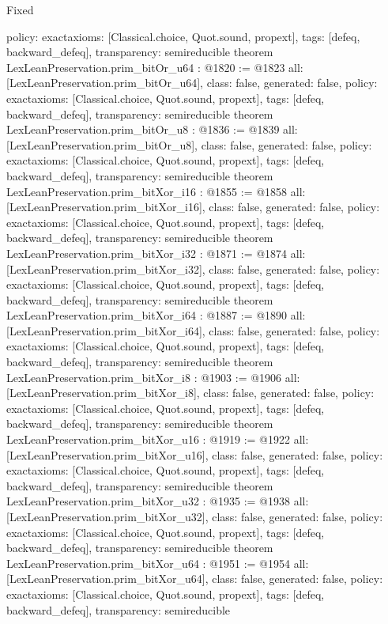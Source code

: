 \begin{lexlean}{Fixed}
\begin{coremodule}
{  policy: exact{axioms: [Classical.choice, Quot.sound, propext]},
  tags: [defeq, backward_defeq],
  transparency: semireducible
}
theorem LexLeanPreservation.prim_bitOr_u64 : @1820 := @1823 {
  all: [LexLeanPreservation.prim_bitOr_u64],
  class: false,
  generated: false,
  policy: exact{axioms: [Classical.choice, Quot.sound, propext]},
  tags: [defeq, backward_defeq],
  transparency: semireducible
}
theorem LexLeanPreservation.prim_bitOr_u8 : @1836 := @1839 {
  all: [LexLeanPreservation.prim_bitOr_u8],
  class: false,
  generated: false,
  policy: exact{axioms: [Classical.choice, Quot.sound, propext]},
  tags: [defeq, backward_defeq],
  transparency: semireducible
}
theorem LexLeanPreservation.prim_bitXor_i16 : @1855 := @1858 {
  all: [LexLeanPreservation.prim_bitXor_i16],
  class: false,
  generated: false,
  policy: exact{axioms: [Classical.choice, Quot.sound, propext]},
  tags: [defeq, backward_defeq],
  transparency: semireducible
}
theorem LexLeanPreservation.prim_bitXor_i32 : @1871 := @1874 {
  all: [LexLeanPreservation.prim_bitXor_i32],
  class: false,
  generated: false,
  policy: exact{axioms: [Classical.choice, Quot.sound, propext]},
  tags: [defeq, backward_defeq],
  transparency: semireducible
}
theorem LexLeanPreservation.prim_bitXor_i64 : @1887 := @1890 {
  all: [LexLeanPreservation.prim_bitXor_i64],
  class: false,
  generated: false,
  policy: exact{axioms: [Classical.choice, Quot.sound, propext]},
  tags: [defeq, backward_defeq],
  transparency: semireducible
}
theorem LexLeanPreservation.prim_bitXor_i8 : @1903 := @1906 {
  all: [LexLeanPreservation.prim_bitXor_i8],
  class: false,
  generated: false,
  policy: exact{axioms: [Classical.choice, Quot.sound, propext]},
  tags: [defeq, backward_defeq],
  transparency: semireducible
}
theorem LexLeanPreservation.prim_bitXor_u16 : @1919 := @1922 {
  all: [LexLeanPreservation.prim_bitXor_u16],
  class: false,
  generated: false,
  policy: exact{axioms: [Classical.choice, Quot.sound, propext]},
  tags: [defeq, backward_defeq],
  transparency: semireducible
}
theorem LexLeanPreservation.prim_bitXor_u32 : @1935 := @1938 {
  all: [LexLeanPreservation.prim_bitXor_u32],
  class: false,
  generated: false,
  policy: exact{axioms: [Classical.choice, Quot.sound, propext]},
  tags: [defeq, backward_defeq],
  transparency: semireducible
}
theorem LexLeanPreservation.prim_bitXor_u64 : @1951 := @1954 {
  all: [LexLeanPreservation.prim_bitXor_u64],
  class: false,
  generated: false,
  policy: exact{axioms: [Classical.choice, Quot.sound, propext]},
  tags: [defeq, backward_defeq],
  transparency: semireducible
}
\end{coremodule}
\end{lexlean}
